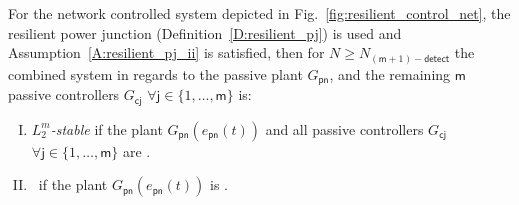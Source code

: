 \begin{corollary}
\label{C:main_corollary}
For the network controlled system depicted in
Fig.~\ref{fig:resilient_control_net}, the resilient power junction
(Definition~\ref{D:resilient_pj}) is used and
Assumption~\ref{A:resilient_pj_ii} is satisfied, then for $N \geq
N_{(\mathsf{m}+1)-\mathsf{detect}}$ the combined system in regards to
the passive plant $G_{\mathsf{pn}}$, and the remaining $\mathsf{m}$
passive controllers $G_{\mathsf{cj}}$ $\forall \mathsf{j} \in
\{1,\dots,\mathsf{m}\}$ is:
\begin{enumerate}[I.]
\item {\it $L^m_2$-stable} if the plant
  $G_{\mathsf{pn}}(e_{\mathsf{pn}}(t))$ and all passive controllers
  $G_{\mathsf{cj}}$  $\forall \mathsf{j} \in \{1,\dots,\mathsf{m}\}$
  are \sop.
\item \passive\ if the plant $G_{\mathsf{pn}}(e_{\mathsf{pn}}(t))$ is \passive.
\end{enumerate}
\end{corollary}
